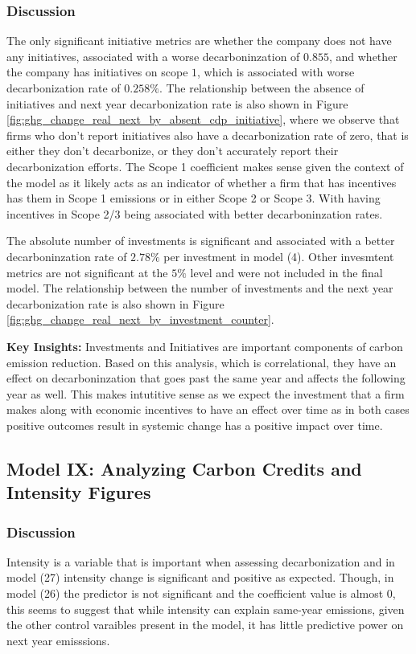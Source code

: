 \subsubsection{Discussion}
The only significant initiative metrics are whether the company does not have any initiatives, associated with a worse decarboninzation of $0.855$, and whether the company has initiatives on scope $1$, which is associated with worse decarbonization rate of $0.258\%$. The relationship between the absence of initiatives and next year decarbonization rate is also shown in Figure \ref{fig:ghg_change_real_next_by_absent_cdp_initiative}, where we observe that firms who don't report initiatives also have a decarbonization rate of zero, that is either they don't decarbonize, or they don't accurately report their decarbonization efforts. The Scope 1 coefficient makes sense given the context of the model as it likely acts as an indicator of whether a firm that has incentives has them in Scope 1 emissions or in either Scope 2 or Scope 3. With having incentives in Scope 2/3 being associated with better decarboninzation rates. 


The absolute number of investments is significant and associated with a better decarboninzation rate of $2.78\%$ per investment in model (4). Other invesmtent metrics are not significant at the $5\%$ level and were not included in the final model. The relationship between the number of investments and the next year decarbonization rate is also shown in Figure \ref{fig:ghg_change_real_next_by_investment_counter}.


\textbf{Key Insights:} Investments and Initiatives are important components of carbon emission reduction. Based on this analysis, which is correlational, they have an effect on decarboninzation that goes past the same year and affects the following year as well. This makes intutitive sense as we expect the investment that a firm makes along with economic incentives to have an effect over time as in both cases positive outcomes result in systemic change has a positive impact over time.


\subsection{Model IX: Analyzing Carbon Credits and Intensity Figures}



\subsubsection{Discussion}
Intensity is a variable that is important when assessing decarbonization and in model (27) intensity change is significant and positive as expected. Though, in model (26) the predictor is not significant and the coefficient value is almost $0$, this seems to suggest that while intensity can explain same-year emissions, given the other control varaibles present in the model, it has little predictive power on next year emisssions.

